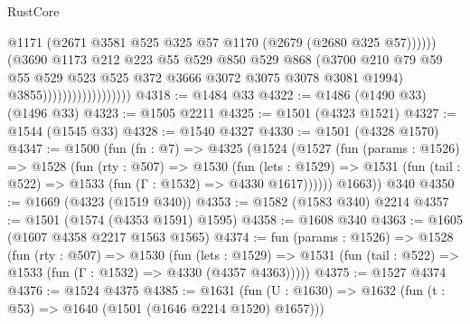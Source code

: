 \begin{lexlean}{RustCore}
\begin{coremodule}
                                            @1171
                                            (@2671
                                              @3581
                                              @525
                                              @325
                                              @57
                                              @1170
                                              (@2679 (@2680 @325 @57))))))
                                      (@3690
                                        @1173
                                        @212
                                        @223
                                        @55
                                        @529
                                        @850
                                        @529
                                        @868
                                        (@3700
                                          @210
                                          @79
                                          @59
                                          @55
                                          @529
                                          @523
                                          @525
                                          @372
                                          @3666
                                          @3072
                                          @3075
                                          @3078
                                          @3081
                                          @1994)
                                        @3855))))))))))))))))))
@4318 := @1484 @33
@4322 := @1486 (@1490 @33) (@1496 @33)
@4323 := @1505 @2211
@4325 := @1501 (@4323 @1521)
@4327 := @1544 (@1545 @33)
@4328 := @1540 @4327
@4330 := @1501 (@4328 @1570)
@4347 := @1500
    (fun (fn : @7) =>
    @4325
      (@1524
        (@1527
          (fun (params : @1526) =>
          @1528
            (fun (rty : @507) =>
            @1530
              (fun (lets : @1529) =>
              @1531 (fun (tail : @522) => @1533 (fun (Γ : @1532) => @4330 @1617))))))
        @1663))
    @340
@4350 := @1669 (@4323 (@1519 @340))
@4353 := @1582 (@1583 @340) @2214
@4357 := @1501 (@1574 (@4353 @1591) @1595)
@4358 := @1608 @340
@4363 := @1605 (@1607 @4358 @2217 @1563 @1565)
@4374 := fun (params : @1526) =>
  @1528
    (fun (rty : @507) =>
    @1530
      (fun (lets : @1529) =>
      @1531 (fun (tail : @522) => @1533 (fun (Γ : @1532) => @4330 (@4357 @4363)))))
@4375 := @1527 @4374
@4376 := @1524 @4375
@4385 := @1631 (fun (U : @1630) => @1632 (fun (t : @53) => @1640 (@1501 (@1646 @2214 @1520) @1657)))

\end{coremodule}
\end{lexlean}
